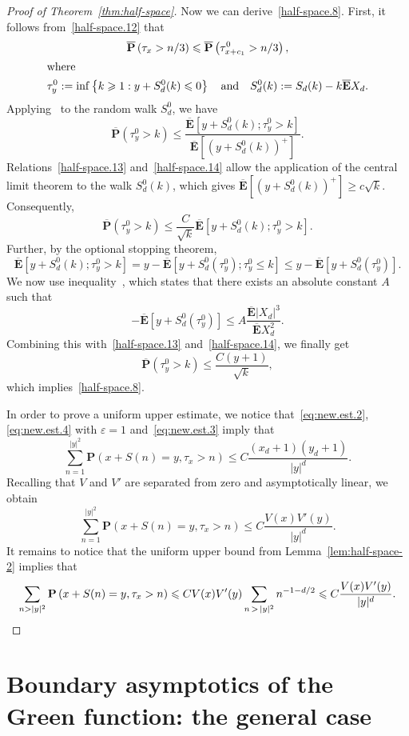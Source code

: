 \documentclass[AHL,Unicode,longabstracts,published]{cedram}
\newcommand{\pr}{\mathbf{P}}
\newcommand{\e}{\mathbf{E}}
\renewcommand{\le}{\leqslant}
\renewcommand{\ge}{\geqslant}
\begin{document}
\begin{proof}[Proof of Theorem~\ref{thm:half-space}]
Now we can derive~\eqref{half-space.8}. First, it follows from~\eqref{half-space.12} that
\begin{gather*}
\overline{\pr}\left(\tau_x>n/3\right)\le \overline{\pr}\left(\tau^0_{x+c_1}>n/3\right),
\\
\intertext{where}
\tau_y^0:=\inf\left\{k\ge1:y+S_d^0(k)\le0\right\}\quad\text{and}\quad S_d^0(k):=S_d(k)-k\overline{\e}X_d.
\end{gather*}
Applying~\cite[Lemma~25]{DeSaWa-18} to the random walk $S_d^0$, we have
\[
\overline{\pr}\left(\tau^0_y>k\right)
\le\frac{\overline{\e}\left[y+S_d^0(k);\tau_y^0>k\right]}{\overline{\e}\left[\left(y+S_d^0(k)\right)^+\right]}.
\]
Relations~\eqref{half-space.13} and~\eqref{half-space.14} allow the application of the central limit theorem to the walk $S_d^0(k)$, which gives $\overline{\e}[(y+S_d^0(k))^+]\ge c\sqrt{k}$. Consequently,
\[
\overline{\pr}\left(\tau^0_y>k\right)\le\frac{C}{\sqrt{k}}\overline{\e}\left[y+S_d^0(k);\tau_y^0>k\right].
\]
Further, by the optional stopping theorem,
\[
\overline{\e}\left[y+S_d^0(k);\tau_y^0>k\right]=y-\overline{\e}\left[y+S_d^0\left(\tau_y^0\right);\tau_y^0\le k\right]
\le y-\overline{\e}\left[y+S_d^0\left(\tau_y^0\right)\right].
\]
We now use inequality~\cite[Equation~(7)]{Mo-73}, which states that there exists an absolute constant $A$ such that
\[
-\overline{\e}\left[y+S_d^0\left(\tau_y^0\right)\right]
\le A\frac{\overline{\e}|X_d|^3}{\overline{\e}X_d^2}.
\]
Combining this with~\eqref{half-space.13} and~\eqref{half-space.14}, we finally get
\[
\overline{\pr}\left(\tau^0_y>k\right)\le \frac{C(y+1)}{\sqrt{k}},
\]
which implies~\eqref{half-space.8}.

In order to prove a uniform upper estimate, we notice that~\eqref{eq:new.est.2}, \eqref{eq:new.est.4} with $\varepsilon=1$ and~\eqref{eq:new.est.3} imply that
\[
\sum_{n=1}^{|y|^2}\pr\left(x+S(n)=y,\tau_x>n\right)
\le C\frac{(x_d+1)(y_d+1)}{|y|^d}.
\]
Recalling that $V$ and $V'$ are separated from zero and asymptotically linear, we obtain
\[
\sum_{n=1}^{|y|^2}\pr\left(x+S(n)=y,\tau_x>n\right)
\le C\frac{V(x)V'(y)}{|y|^d}.
\]
It remains to notice that the uniform upper bound from Lemma~\ref{lem:half-space-2} implies that
\[
\sum_{n>|y|^2}\pr\left(x+S(n)=y,\tau_x>n\right)
\le CV(x)V'(y)\sum_{n\,>\,|y|^2} n^{-1-d/2}
\le C\frac{V(x)V'(y)}{|y|^d}.\qedhere
\]
\end{proof}

\section{Boundary asymptotics of the Green function: the general case}\label{sec:boundary}
\end{document}
